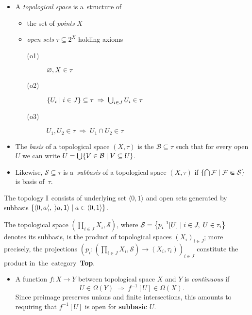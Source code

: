 \begin{itemize}
\item A \emph{topological space} is a~structure of
  \begin{itemize}
  \item the set of \emph{points\/} $X$
  \item \emph{open sets\/} $\tau\subseteq 2^X$ holding axioms
    \begin{description}
    \item[(o1)] $\varnothing, X \in \tau$
    \item[(o2)] $\left\{ U_i \mid i\in J \right\} \subseteq \tau \; \Rightarrow
    \; \bigcup_{i\in J} U_i \in \tau$
    \item[(o3)] $U_1, U_2 \in \tau \; \Rightarrow \; U_1 \cap U_2 \in \tau$
    \end{description}
  \end{itemize}

\item The \emph{basis} of a topological space $(X, \tau)$ is the
$\mathcal{B}\subseteq \tau$ such that for every open $U$ we can write $U =
\bigcup \{V\in \mathcal{B} \mid V\subseteq U \}$.

\item Likewise, $\mathcal{S}\subseteq \tau$ is a~\emph{subbasis} of a
topological space $(X, \tau)$ if $\left\{ \bigcap \mathcal{F} \mid \mathcal{F}
\Subset \mathcal{S} \right\}$ is basis of~$\tau$.
\end{itemize}

\begin{exmpl}
  The topology $\mathbb{I}$ consists of underlying set $\langle 0, 1 \rangle$ and open
  sets generated by subbasis $\{ \langle 0, a \langle, \; \rangle a, 1 \rangle
  \mid a\in \langle 0, 1 \rangle \}$.
\end{exmpl}

\begin{fact}
  The topological space $\left( \prod_{i\in J} X_i, \mathcal{S} \right)$, where
  $\mathcal{S} = \left\{ p_{i}^{-1}[U] \mid i\in J, \; U\in \tau_i \right\}$
  denotes its subbasis, is the product of topological spaces $\left( X_i
  \right)_{i\in J}$;
  more precisely, the projections $\left( p_i\colon \left(\prod_{i\in J} X_i,
  \mathcal{S}\right) \to \left(X_i, \tau_i\right) \right)_{i\in J}$
  constitute the product in~the~category~{\bf Top}.
\end{fact}

\begin{itemize}
\item A function $f\colon X \to Y$ between topological space $X$ and $Y$ is
\emph{continuous} if 
\[
  U\in \Omega(Y) \; \Longrightarrow \; f^{-1}[U]\in \Omega(X).
\]
Since preimage preserves unions and finite intersections, this amounts to
requiring that $f^{-1}[U]$ is open for {\bf subbasic} $U$.
\end{itemize}


